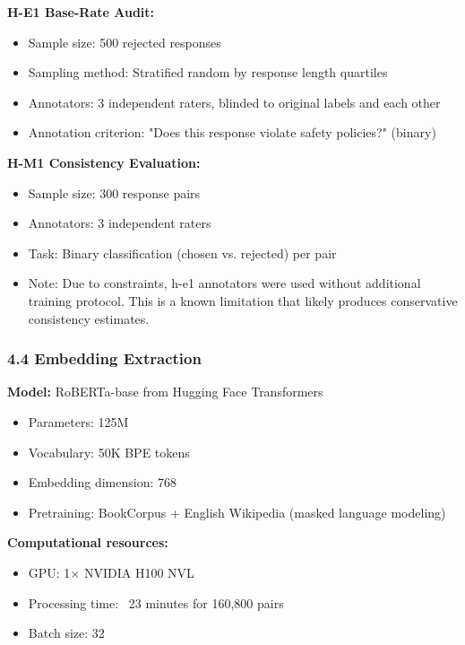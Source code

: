 \textbf{H-E1 Base-Rate Audit:}
\begin{itemize}
\item Sample size: 500 rejected responses
\item Sampling method: Stratified random by response length quartiles
\item Annotators: 3 independent raters, blinded to original labels and each other
\item Annotation criterion: "Does this response violate safety policies?" (binary)
\end{itemize}

\textbf{H-M1 Consistency Evaluation:}
\begin{itemize}
\item Sample size: 300 response pairs
\item Annotators: 3 independent raters
\item Task: Binary classification (chosen vs. rejected) per pair
\item Note: Due to constraints, h-e1 annotators were used without additional training protocol. This is a known limitation that likely produces conservative consistency estimates.
\end{itemize}

\subsubsection{4.4 Embedding Extraction}

\textbf{Model:} RoBERTa-base \citep{Liuetal2019} from Hugging Face Transformers
\begin{itemize}
\item Parameters: 125M
\item Vocabulary: 50K BPE tokens
\item Embedding dimension: 768
\item Pretraining: BookCorpus + English Wikipedia (masked language modeling)
\end{itemize}

\textbf{Computational resources:}
\begin{itemize}
\item GPU: 1× NVIDIA H100 NVL
\item Processing time: ~23 minutes for 160,800 pairs
\item Batch size: 32
\end{itemize}
